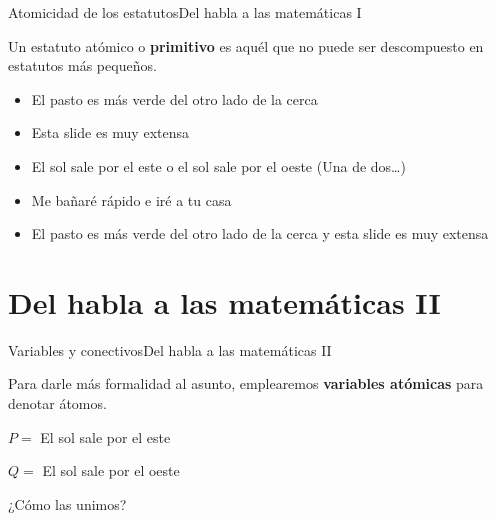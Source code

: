 \documentclass[spanish, c]{beamer}
\begin{document}
\begin{frame}{Atomicidad de los estatutos}{Del habla a las matemáticas I}

    Un estatuto \alert{atómico} o \textbf{primitivo} es aquél que no puede ser descompuesto en estatutos más pequeños. \pause

    \bigskip

    \begin{itemize}[<+->]
        \item El pasto es más verde del otro lado de la cerca
        \item Esta slide es muy extensa
    \end{itemize}
    
     \pause 

    \begin{itemize}[<+->]
        \item El sol sale por el este o el sol sale por el oeste {\tiny (Una de dos\dots)}
        \item Me bañaré rápido e iré a tu casa
        \item El pasto es más verde del otro lado de la cerca y esta slide es muy extensa
    \end{itemize}
\end{frame}

\section{Del habla a las matemáticas II}

\begin{frame}{Variables y conectivos}{Del habla a las matemáticas II}

    Para darle más formalidad al asunto, emplearemos \textbf{variables atómicas} para denotar \alert{átomos}. \pause

    \bigskip

    \begin{center}
        \Large
        $P =$ El sol sale por el este

        $Q =$ El sol sale por el oeste
    \end{center} \pause

    \bigskip

    ¿Cómo las unimos?
\end{frame}
\end{document}
